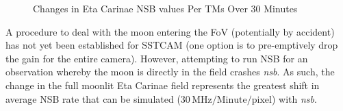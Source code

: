 \begin{figure}[ht]
\begin{minipage}{\linewidth}\centering
{}
\caption{Changes in Eta Carinae NSB values Per TMs Over 30 Minutes}
\label{fig:30minsetacarTM}
\end{minipage}
\end{figure} 
A procedure to deal with the moon entering the FoV (potentially by accident) has not yet been established for SSTCAM (one option is to pre-emptively drop the gain for the entire camera). However, attempting to run NSB for an observation whereby the moon is directly in the field crashes \textit{nsb}. As such, the change in the full moonlit Eta Carinae field represents the greatest shift in average NSB rate that can be simulated ($\mathrm{30\,MHz/Minute/pixel}$) with \textit{nsb}.

